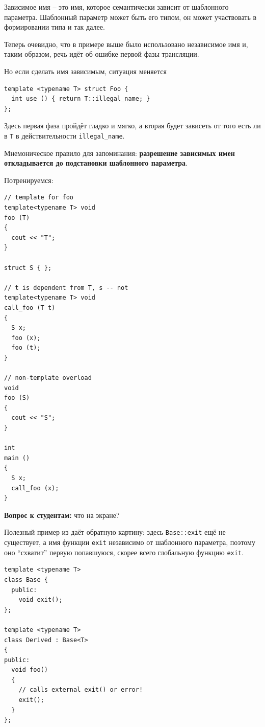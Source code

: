 \documentclass[a4paper,12pt,oneside]{article}
\newif\ifanswers
\begin{document}
Зависимое имя -- это имя, которое семантически зависит от шаблонного параметра. Шаблонный параметр может быть его типом, он может участвовать в формировании типа и так далее.

Теперь очевидно, что в примере выше было использовано независимое имя и, таким образом, речь идёт об ошибке первой фазы трансляции.

Но если сделать имя зависимым, ситуация меняется

\begin{lstlisting}
template <typename T> struct Foo {
  int use () { return T::illegal_name; }
};
\end{lstlisting}

Здесь первая фаза пройдёт гладко и мягко, а вторая будет зависеть от того есть ли в \lstinline!T! в действительности \lstinline!illegal_name!.

Мнемоническое правило для запоминания: \textbf{разрешение зависимых имен откладывается до подстановки шаблонного параметра}.

Потренируемся:

\begin{lstlisting}
// template for foo
template<typename T> void 
foo (T) 
{ 
  cout << "T"; 
}

struct S { };

// t is dependent from T, s -- not
template<typename T> void 
call_foo (T t) 
{
  S x;
  foo (x);
  foo (t); 
}

// non-template overload
void 
foo (S) 
{   
  cout << "S"; 
}

int 
main () 
{
  S x; 
  call_foo (x); 
}
\end{lstlisting}

\textbf{Вопрос к студентам:} что на экране?

\ifanswers
Правильный ответ: TS. 

Более специальная функция \lstinline!foo! просто ещё не объявлена в точке вызова \lstinline!foo(x)!, а вот разрешение вызова \lstinline!foo(t)! откладывается до подстановки \lstinline!t!, которая происходит после объявления более специальной функции.
\fi

Полезный пример из \cite{vandervoord} даёт обратную картину: здесь \lstinline!Base::exit! ещё не существует, а имя функции \lstinline!exit! независимо от шаблонного параметра, поэтому оно ``схватит'' первую попавшуюся, скорее всего глобальную функцию \lstinline!exit!.

\begin{lstlisting}
template <typename T> 
class Base { 
  public: 
    void exit(); 
};

template <typename T> 
class Derived : Base<T> 
{ 
public: 
  void foo() 
  { 
    // calls external exit() or error! 
    exit();   
  } 
}; 
\end{lstlisting}
\end{document}
